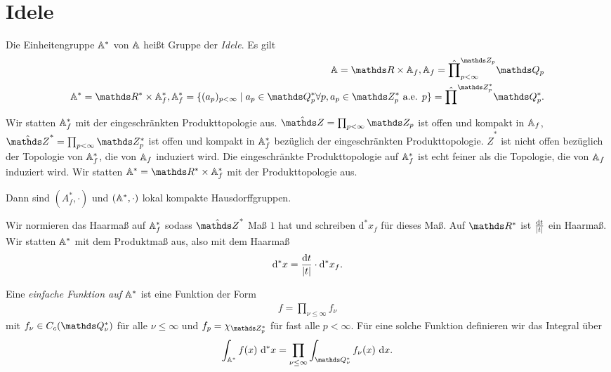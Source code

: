 \chapter{Idele}
\begin{defi}
Die Einheitengruppe $\mathbb{A}^\ast$ von $\mathbb{A}$ heißt Gruppe der \emph{Idele}.
Es gilt
\begin{align*}
\A =\R \times \A_f, \A_f=\hat{\prod}_{p <\infty}^{\Z_p} \Q_p\\
\A^\ast =\R^\ast \times \A_f^\ast, \A_f^\ast=\{(a_p)_{p<\infty} \mid a_p \in \Q_p^\ast \forall p, a_p \in \Z_p^\ast \text{ a.e. } p\}=\hat{\prod}^{\Z_p^\ast} \Q_p^\ast.
\end{align*}
\end{defi}
Wir statten $\mathbb{A}_f^\ast$ mit der eingeschränkten Produkttopologie aus.
$\hat{\Z}=\prod_{p<\infty} \Z_p$ ist offen und kompakt in $\mathbb{A}_f$,
$\hat{\Z}^\ast=\prod_{p<\infty} \Z_p^\ast$ ist offen und kompakt in $\mathbb{A}_f^\ast$ bezüglich der eingeschränkten Produkttopologie.
$\hat{Z}^\ast$ ist nicht offen bezüglich der Topologie von $\mathbb{A}_f^\ast$, die von $\mathbb{A}_f$ induziert wird.
Die eingeschränkte Produkttopologie auf $\mathbb{A}_f^\ast$ ist echt feiner als die Topologie, die von $\mathbb{A}_f$ induziert wird.
Wir statten $\A^\ast=\R^\ast\times \A_f^\ast$ mit der Produkttopologie aus. 

\begin{thm}
Dann sind $(A_f^\ast,\cdot)$ und $(\mathbb{A}^\ast,\cdot)$ lokal kompakte Hausdorffgruppen.
\end{thm}

Wir normieren das Haarmaß auf $\mathbb{A}_f^\ast$ sodass $\hat{\Z}^\ast$ Maß $1$ hat und schreiben $\mathrm{d}^\ast x_f$ für dieses Maß.
Auf $\R^\ast$ ist $\frac{\mathrm{d}t}{\left\vert t\right\vert}$ ein Haarmaß.
Wir statten $\mathbb{A}^\ast$ mit dem Produktmaß aus, also mit dem Haarmaß
\begin{align*}
\mathrm{d}^\ast x=\frac{\mathrm{d}t}{\left\vert t\right\vert}\cdot \mathrm{d}^\ast x_f.
\end{align*}

\begin{defi}
Eine \emph{einfache Funktion auf $\mathbb{A}^\ast$} ist eine Funktion der Form
\begin{align*}
f=\prod_{\nu \leq \infty}f_\nu
\end{align*}
mit $f_\nu\in C_c(\Q_\nu^\ast)$ für alle $\nu\leq \infty$ und $f_p=\chi_{\Z_p^\ast}$ für fast alle $p<\infty$.
Für eine solche Funktion definieren wir das Integral über
\begin{align*}
\int_{\A^\ast} f(x)~\mathrm{d}^\ast x=\prod_{\nu \leq \infty} \int_{\Q_\nu^\ast} f_\nu(x)~\mathrm{d}x.
\end{align*}
\end{defi}

